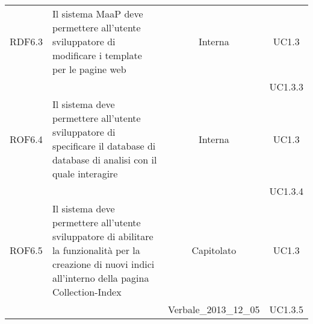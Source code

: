 \begin{longtable}{|c|p{6cm}|c|c|}
\midrule
RDF6.3
& Il sistema MaaP deve permettere all'utente sviluppatore di modificare i template per le pagine web
& Interna
& UC1.3\\
& & & UC1.3.3
\\

\midrule
ROF6.4
& Il sistema deve permettere all'utente sviluppatore di specificare il database di database di analisi con il quale interagire
& Interna
& UC1.3\\
& & & UC1.3.4
\\

\midrule
ROF6.5
& Il sistema deve permettere all'utente sviluppatore di abilitare la funzionalità per la creazione di nuovi indici all'interno della pagina Collection-Index
& Capitolato
& UC1.3\\
& & Verbale\_2013\_12\_05 & UC1.3.5
\\


\end{longtable}

\newpage
